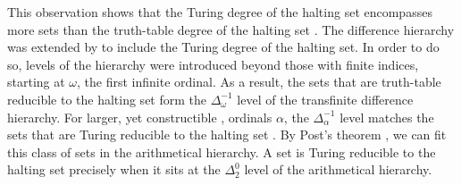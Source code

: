 This observation shows that the Turing degree of the halting set encompasses more sets than the truth-table degree of the halting set \parencite{epstein1981hierarchies,arslanov1997degree,downey2010algorithmic}.
The difference hierarchy was extended by \textcite{ershov1968hierarchyii} to include the Turing degree of the halting set.
In order to do so, levels of the hierarchy were introduced beyond those with finite indices, starting at $\omega$, the first infinite ordinal.
As a result, the sets that are truth-table reducible to the halting set form the $\Delta^{-1}_\omega$ level of the transfinite difference hierarchy.
For larger, yet constructible \parencite{rogers1967theory}, ordinals $\alpha$, the $\Delta^{-1}_\alpha$ level matches the sets that are Turing reducible to the halting set \parencite{ershov1968hierarchyii,epstein1981hierarchies}.
By Post's theorem \parencite{post1948degrees,rogers1967theory}, we can fit this class of sets in the arithmetical hierarchy.
A set is Turing reducible to the halting set precisely when it sits at the $\Delta^0_2$ level of the arithmetical hierarchy.

